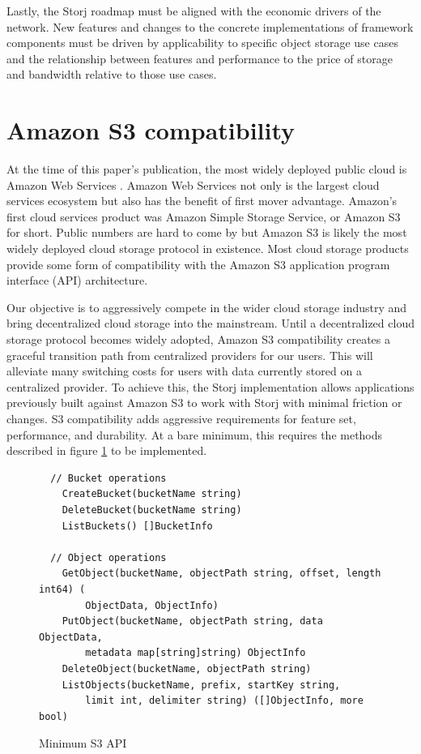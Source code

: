 \documentclass[8pt,fleqn,openany]{book}
\begin{document}
Lastly, the Storj roadmap must be aligned with the economic drivers of the
network.
New features and changes to the concrete implementations of framework
components must be driven by applicability to specific object storage use cases
and the relationship between features and performance to the price of storage
and bandwidth relative to those use cases.

\section{Amazon S3 compatibility}\label{constraint-amazon}

At the time of this paper's publication, the most widely deployed public cloud
is Amazon Web Services \cite{aws-dominates}. Amazon Web Services not only
is the largest cloud services ecosystem but also has the benefit of first mover
advantage. Amazon's first cloud services product was Amazon Simple Storage
Service, or Amazon S3 for short. Public numbers are hard to come by but
Amazon S3 is likely the most widely deployed cloud storage protocol in existence.
Most cloud storage products provide some form of compatibility with the
Amazon S3 application program interface (API) architecture.

Our objective is to aggressively compete in the wider cloud
storage industry and bring decentralized cloud storage into the mainstream.
Until a decentralized cloud storage protocol becomes widely adopted,
Amazon S3 compatibility creates a graceful transition path from centralized
providers for our users.
This will alleviate many switching costs for users with data currently stored on
a centralized provider.
To achieve this, the Storj implementation allows
applications previously built against Amazon S3 to work with Storj with
minimal friction or changes.
S3 compatibility adds aggressive requirements for feature set, performance, and
durability.
At a bare minimum, this requires the methods described in
figure \ref{fig:s3-api-code} to be implemented.

\begin{figure}[!htbp]
\lstset{language=Golang}
\begin{lstlisting}
  // Bucket operations
	CreateBucket(bucketName string)
	DeleteBucket(bucketName string)
	ListBuckets() []BucketInfo

  // Object operations
	GetObject(bucketName, objectPath string, offset, length int64) (
	    ObjectData, ObjectInfo)
	PutObject(bucketName, objectPath string, data ObjectData,
	    metadata map[string]string) ObjectInfo
	DeleteObject(bucketName, objectPath string)
	ListObjects(bucketName, prefix, startKey string,
	    limit int, delimiter string) ([]ObjectInfo, more bool)
\end{lstlisting}
\caption{Minimum S3 API}
\label{fig:s3-api-code}
\end{figure}
\end{document}
